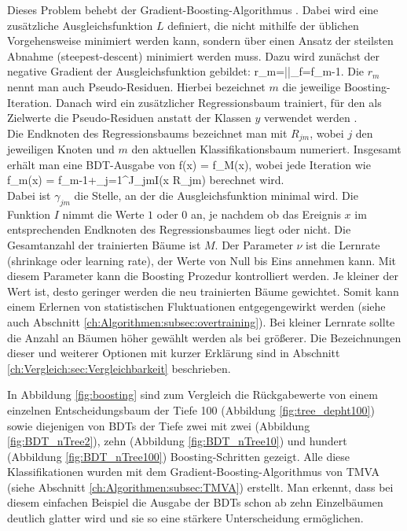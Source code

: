 Dieses Problem behebt der Gradient-Boosting-Algorithmus \cite{Friedman00greedyfunction}. Dabei wird eine zus\"atzliche Ausgleichsfunktion $L$ definiert, die nicht mithilfe der \"ublichen Vorgehensweise minimiert werden kann, sondern \"uber einen Ansatz der steilsten Abnahme (steepest-descent) minimiert werden muss. Dazu wird zun\"achst der negative Gradient der Ausgleichsfunktion gebildet:
\beq
r_m=\left|\right|_{f=f_{m-1}}.
\label{eq:pseudo_residual}
\eeq
Die $r_m$ nennt man auch Pseudo-Residuen. Hierbei bezeichnet $m$ die jeweilige Boosting-Iteration. Danach wird ein zus\"atzlicher Regressionsbaum trainiert, f\"ur den als Zielwerte die Pseudo-Residuen anstatt der Klassen $y$ verwendet werden \cite{Hocker:2007ht}.\\
Die Endknoten des Regressionsbaums bezeichnet man mit $R_{jm}$, wobei $j$ den jeweiligen Knoten und $m$ den aktuellen Klassifikationsbaum numeriert. Insgesamt erh\"alt man eine BDT-Ausgabe von
\beq
\hat f(x) = f_M(x),
\eeq
wobei jede Iteration wie
\beq
f_m(x) = f_{m-1}+\nu\cdot\sum_{j=1}^J\gamma_{jm}I(x \in R_{jm})
\eeq
berechnet wird.\\
Dabei ist $\gamma_{jm}$ die Stelle, an der die Ausgleichsfunktion minimal wird. Die Funktion $I$ nimmt die Werte $1$ oder $0$ an, je nachdem ob das Ereignis $x$ im entsprechenden Endknoten des Regressionsbaumes liegt oder nicht. Die Gesamtanzahl der trainierten B\"aume ist $M$.
Der Parameter $\nu$ ist die Lernrate (shrinkage oder learning rate), der Werte von Null bis Eins annehmen kann. Mit diesem Parameter kann die Boosting Prozedur kontrolliert werden. Je kleiner der Wert ist, desto geringer werden die neu trainierten B\"aume gewichtet. Somit kann einem Erlernen von statistischen Fluktuationen entgegengewirkt werden (siehe auch Abschnitt \ref{ch:Algorithmen:subsec:overtraining}). Bei kleiner Lernrate sollte die Anzahl an B\"aumen h\"oher gew\"ahlt werden als bei gr\"o\ss erer. Die Bezeichnungen dieser und weiterer Optionen mit kurzer Erkl\"arung sind in Abschnitt \ref{ch:Vergleich:sec:Vergleichbarkeit} beschrieben.

In Abbildung \ref{fig:boosting} sind zum Vergleich die R\"uckgabewerte von einem einzelnen Entscheidungsbaum der Tiefe 100 (Abbildung \ref{fig:tree_depht100}) sowie diejenigen von BDTs der Tiefe zwei mit zwei (Abbildung \ref{fig:BDT_nTree2}), zehn (Abbildung \ref{fig:BDT_nTree10}) und hundert (Abbildung \ref{fig:BDT_nTree100}) Boosting-Schritten gezeigt. Alle diese Klassifikationen wurden mit dem Gradient-Boosting-Algorithmus von TMVA (siehe Abschnitt \ref{ch:Algorithmen:subsec:TMVA}) erstellt. Man erkennt, dass bei diesem einfachen Beispiel die Ausgabe der BDTs schon ab zehn Einzelb\"aumen deutlich glatter wird und sie so eine st\"arkere Unterscheidung erm\"oglichen.

